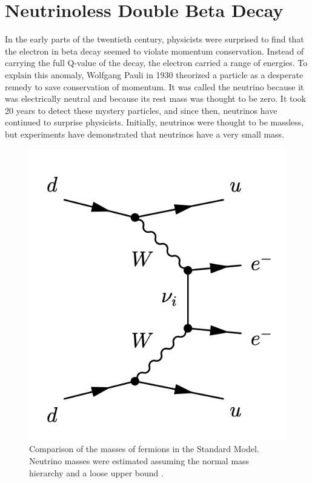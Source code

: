 \chapter{Neutrinoless Double Beta Decay}
In the early parts of the twentieth century, physicists were surprised to find that the electron in beta decay seemed to violate momentum conservation. Instead of carrying the full Q-value of the decay, the electron carried a range of energies. To explain this anomaly, Wolfgang Pauli in 1930 theorized a particle as a desperate remedy to save conservation of momentum. It was called the neutrino because it was electrically neutral and because its rest mass was thought to be zero. It took 20 years to detect these mystery particles, and since then, neutrinos have continued to surprise physicists. Initially, neutrinos were thought to be massless, but experiments have demonstrated that neutrinos have a very small mass.

\begin{figure}
\centering
\includegraphics[scale=0.4]{ch1/figs/0nbb_feynman_diag.png}
\caption{Comparison of the masses of fermions in the Standard Model. Neutrino masses were estimated assuming the normal mass hierarchy and a loose upper bound \cite{Hewett:2012ns}.}
\label{n_mass_comp}
\end{figure}

